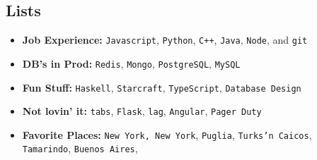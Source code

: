 \documentclass[oneside, final]{scrartcl}
\newcommand{\lang}[1]{\colorbox{light-gray}{\texttt{#1}}}
\begin{document}
\begin{center}
\section{Lists}
\begin{itemize}
	\setlength{\itemsep}{1pt}
	\setlength{\parskip}{0pt}
	\setlength{\parsep}{0pt}
	\setlength{\leftmargin}{-5mm}
	\item \textbf{Job Experience:}  \lang{Javascript}, \lang{Python}, \lang{C++}, \lang{Java}, \lang{Node}, and \lang{git} \\
	\item \textbf{DB's in Prod:} \lang{Redis}, \lang{Mongo}, \lang{PostgreSQL}, \lang{MySQL} \\
	\item \textbf{Fun Stuff:}  \lang{Haskell}, \lang{Starcraft}, \lang{TypeScript}, \lang{Database Design} \\
	\item \textbf{Not lovin' it:} \lang{tabs}, \lang{Flask}, \lang{lag}, \lang{Angular}, \lang{Pager Duty}
	\item \textbf{Favorite Places:}
            \lang{New York, New York},
            \lang{Puglia},
            \lang{Turks'n Caicos},
            \lang{Tamarindo},
            \lang{Buenos Aires},
\end{itemize}



\end{center}
\end{document}
